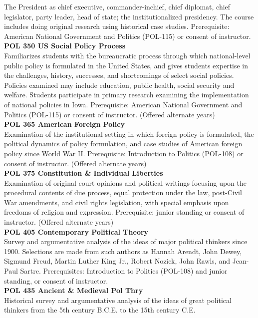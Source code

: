 \documentclass[
  letterpaper,
]{scrbook}
\begin{document}
The President as chief executive, commander-inchief, chief diplomat,
chief legislator, party leader, head of state; the institutionalized
presidency. The course includes doing original research using historical
case studies. Prerequisite: American National Government and Politics
(POL-115) or consent of instructor.\\
\textbf{POL 350 US Social Policy Process}\\
Familiarizes students with the bureaucratic process through which
national-level public policy is formulated in the United States, and
gives students expertise in the challenges, history, successes, and
shortcomings of select social policies. Policies examined may include
education, public health, social security and welfare. Students
participate in primary research examining the implementation of national
policies in Iowa. Prerequisite: American National Government and
Politics (POL-115) or consent of instructor. (Offered alternate years)\\
\textbf{POL 365 American Foreign Policy}\\
Examination of the institutional setting in which foreign policy is
formulated, the political dynamics of policy formulation, and case
studies of American foreign policy since World War II. Prerequisite:
Introduction to Politics (POL-108) or consent of instructor. (Offered
alternate years)\\
\textbf{POL 375 Constitution \& Individual Liberties}\\
Examination of original court opinions and political writings focusing
upon the procedural contents of due process, equal protection under the
law, post-Civil War amendments, and civil rights legislation, with
special emphasis upon freedoms of religion and expression. Prerequisite:
junior standing or consent of instructor. (Offered alternate years)\\
\textbf{POL 405 Contemporary Political Theory}\\
Survey and argumentative analysis of the ideas of major political
thinkers since 1900. Selections are made from such authors as Hannah
Arendt, John Dewey, Sigmund Freud, Martin Luther King Jr., Robert
Nozick, John Rawls, and Jean-Paul Sartre. Prerequisites: Introduction to
Politics (POL-108) and junior standing, or consent of instructor.\\
\textbf{POL 435 Ancient \& Medieval Pol Thry}\\
Historical survey and argumentative analysis of the ideas of great
political thinkers from the 5th century B.C.E. to the 15th century C.E.
\end{document}
